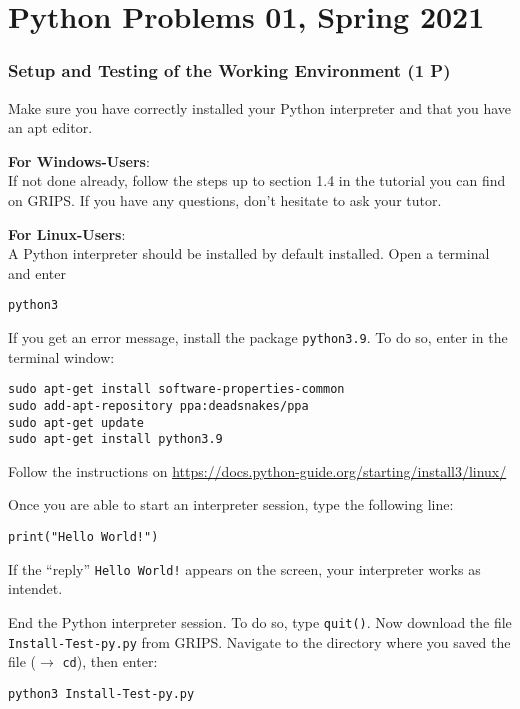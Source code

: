 \documentclass[
	english,
	fontsize=10pt,
	parskip=half,
	titlepage=true,
	DIV=12
]{scrartcl}
\begin{document}
\part*{Python Problems 01, Spring 2021}

\section{Setup and Testing of the Working Environment (1 P)}
Make sure you have correctly installed your Python interpreter and that you have an apt editor.

\textbf{For Windows-Users}:\\
If not done already, follow the steps up to section 1.4 in the tutorial you can find on GRIPS. If you have any questions, don't hesitate to ask your tutor.

\textbf{For Linux-Users}:\\
A Python interpreter should be installed by default installed. Open a terminal and enter
\begin{center}
	\texttt{python3}
\end{center}
If you get an error message, install the package \texttt{python3.9}. To do so, enter in the terminal window:
\begin{center}
	\texttt{sudo apt-get install software-properties-common}\\
	\texttt{sudo add-apt-repository ppa:deadsnakes/ppa}\\
	\texttt{sudo apt-get update}\\
	\texttt{sudo apt-get install python3.9}
\end{center}

Follow the instructions on \url{https://docs.python-guide.org/starting/install3/linux/}

Once you are able to start an interpreter session, type the following line:
\begin{center}
	\texttt{print("Hello World!")}
\end{center}
If the \enquote{reply} \texttt{Hello World!} appears on the screen, your interpreter works as intendet.

End the Python interpreter session. To do so, type \texttt{quit()}. Now download the file  \texttt{Install-Test-py.py} from GRIPS. Navigate to the directory where you saved the file ($\rightarrow$ \texttt{cd}), then enter:
\begin{center}
	\texttt{python3 Install-Test-py.py}
\end{center}
\end{document}
